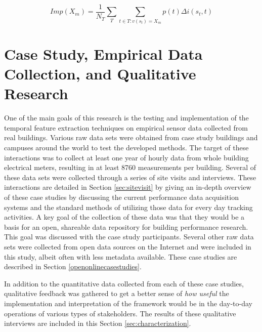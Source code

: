 \begin{equation}
Imp(X_m) = \frac{1}{N_T}\sum\limits_T\sum\limits_{t\in T:v(s_t)=X_m} p(t) \Delta i (s_t, t)
\label{eq:varimportance}
\end{equation}

\section{Case Study, Empirical Data Collection, and Qualitative Research}
\label{sec:screeningdata}


One of the main goals of this research is the testing and implementation of the temporal feature extraction techniques on empirical sensor data collected from real buildings. Various raw data sets were obtained from case study buildings and campuses around the world to test the developed methods. The target of these interactions was to collect at least one year of hourly data from whole building electrical meters, resulting in at least 8760 measurements per building. Several of these data sets were collected through a series of site visits and interviews. These interactions are detailed in Section \ref{sec:sitevisit} by giving an in-depth overview of these case studies by discussing the current performance data acquisition systems and the standard methods of utilizing those data for every day tracking activities. A key goal of the collection of these data was that they would be a basis for an open, shareable data repository for building performance research. This goal was discussed with the case study participants. Several other raw data sets were collected from open data sources on the Internet and were included in this study, albeit often with less metadata available. These case studies are described in Section \ref{openonlinecasestudies}. 

In addition to the quantitative data collected from each of these case studies, qualitative feedback was gathered to get a better sense of \emph{how useful} the implementation and interpretation of the framework would be in the day-to-day operations of various types of stakeholders. The results of these qualitative interviews are included in this Section \ref{sec:characterization}.

